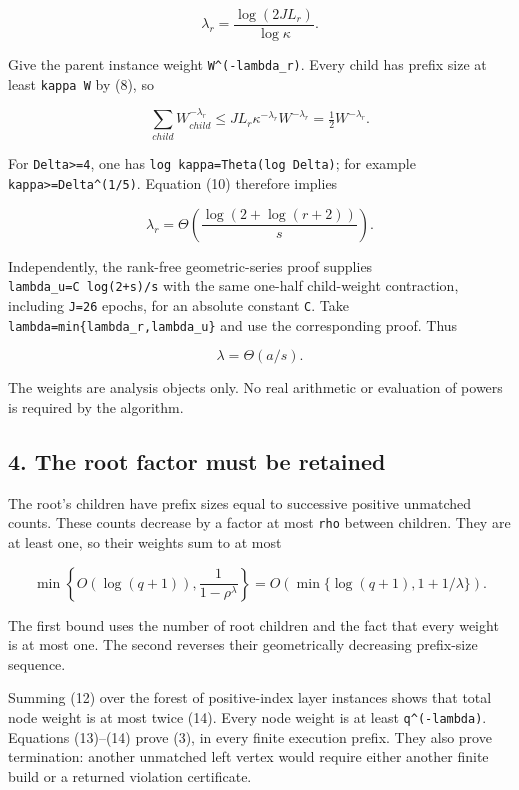 \[
\lambda_r=\frac{\log(2J L_r)}{\log\kappa}.
 \tag{11}
\]

Give the parent instance weight \texttt{W\^{}(-lambda\_r)}. Every child has prefix size at least \texttt{kappa\ W} by (8), so

\[
\sum_{child} W_{child}^{-\lambda_r}
       \le J L_r\kappa^{-\lambda_r} W^{-\lambda_r}
       =\tfrac12W^{-\lambda_r}.
 \tag{12}
\]

For \texttt{Delta\textgreater{}=4}, one has \texttt{log\ kappa=Theta(log\ Delta)}; for example \texttt{kappa\textgreater{}=Delta\^{}(1/5)}. Equation (10) therefore implies

\[
\lambda_r=\Theta\!\left(
                   \frac{\log(2+\log(r+2))}s\right).
\]

Independently, the rank-free geometric-series proof supplies \texttt{lambda\_u=C\ log(2+s)/s} with the same one-half child-weight contraction, including \texttt{J=26} epochs, for an absolute constant \texttt{C}. Take \texttt{lambda=min\{lambda\_r,lambda\_u\}} and use the corresponding proof. Thus

\[
\lambda=\Theta(a/s).
 \tag{13}
\]

The weights are analysis objects only. No real arithmetic or evaluation of powers is required by the algorithm.

\hypertarget{af-6a8212874a-the-root-factor-must-be-retained}{%
\subsection{4. The root factor must be retained}\label{af-6a8212874a-the-root-factor-must-be-retained}}

The root's children have prefix sizes equal to successive positive unmatched counts. These counts decrease by a factor at most \texttt{rho} between children. They are at least one, so their weights sum to at most

\[
\min\left\{O(\log(q+1)),\frac1{1-\rho^\lambda}\right\}
       =O\!\left(\min\{\log(q+1),1+1/\lambda\}\right).
 \tag{14}
\]

The first bound uses the number of root children and the fact that every weight is at most one. The second reverses their geometrically decreasing prefix-size sequence.

Summing (12) over the forest of positive-index layer instances shows that total node weight is at most twice (14). Every node weight is at least \texttt{q\^{}(-lambda)}. Equations (13)--(14) prove (3), in every finite execution prefix. They also prove termination: another unmatched left vertex would require either another finite build or a returned violation certificate.

